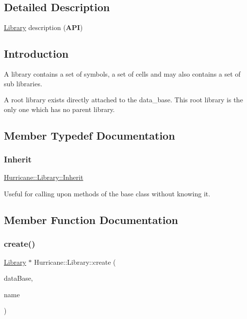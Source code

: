 \subsection{Detailed Description}
\mbox{\hyperlink{classHurricane_1_1Library}{Library}} description ({\bfseries A\+PI}) 

\hypertarget{classHurricane_1_1Library_secLibraryIntro}{}\subsection{Introduction}\label{classHurricane_1_1Library_secLibraryIntro}
A library contains a set of symbols, a set of cells and may also contains a set of sub libraries.

A root library exists directly attached to the data\+\_\+base. This root library is the only one which has no parent library. 

\subsection{Member Typedef Documentation}
\mbox{\label{classHurricane_1_1Library_a30ef446b2da0d405bdf4e11ce67b160f}} 
\subsubsection{\texorpdfstring{Inherit}{Inherit}}
{\footnotesize\ttfamily \mbox{\hyperlink{classHurricane_1_1Library_a30ef446b2da0d405bdf4e11ce67b160f}{Hurricane\+::\+Library\+::\+Inherit}}}

Useful for calling upon methods of the base class without knowing it. 

\subsection{Member Function Documentation}
\mbox{\label{classHurricane_1_1Library_af304234d0347128300df5ad09801229d}} 
\subsubsection{\texorpdfstring{create()}{create()}\hspace{0.1cm}{\footnotesize\ttfamily [1/2]}}
{\footnotesize\ttfamily \mbox{\hyperlink{classHurricane_1_1Library}{Library}} $\ast$ Hurricane\+::\+Library\+::create (\begin{DoxyParamCaption}\item[{\mbox{\hyperlink{classHurricane_1_1DataBase}{Data\+Base}} $\ast$}]{data\+Base,  }\item[{const \mbox{\hyperlink{classHurricane_1_1Name}{Name}} \&}]{name }\end{DoxyParamCaption})\hspace{0.3cm}{\ttfamily [static]}}

